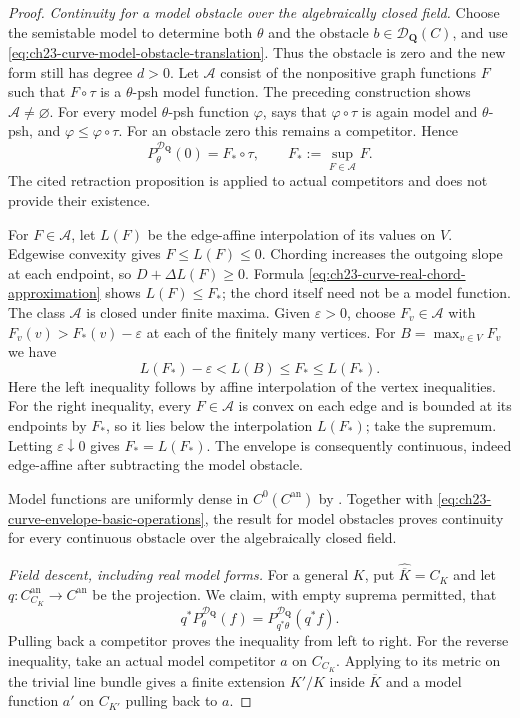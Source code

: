 \begin{proof}
\emph{Continuity for a model obstacle over the algebraically closed field.}
Choose the semistable model to determine both $\theta$ and the obstacle
$b\in\mathcal D_{\mathbf Q}(C)$, and use
\eqref{eq:ch23-curve-model-obstacle-translation}.  Thus the obstacle is zero
and the new form still has degree $d>0$.
Let $\mathcal A$ consist of the nonpositive graph functions $F$ such
that $F\circ\tau$ is a $\theta$-psh model function.
The preceding construction shows $\mathcal A\ne\varnothing$.
For every model $\theta$-psh function $\varphi$,
\cite[Proposition~3.8]{GJKM19} says that $\varphi\circ\tau$ is again
model and $\theta$-psh, and $\varphi\leq\varphi\circ\tau$.
For an obstacle zero this remains a competitor.  Hence
\begin{equation}
\label{eq:ch23-curve-skeletal-envelope}
 P^{\mathcal D_{\mathbf Q}}_\theta(0)=F_*\circ\tau,
 \qquad F_*:=\sup_{F\in\mathcal A}F.
\end{equation}
The cited retraction proposition is applied to actual competitors and
does not provide their existence.

For $F\in\mathcal A$, let $L(F)$ be the edge-affine interpolation of
its values on $V$.  Edgewise convexity gives $F\leq L(F)\leq0$.
Chording increases the outgoing slope at each endpoint, so
$D+\Delta L(F)\geq0$.  Formula
\eqref{eq:ch23-curve-real-chord-approximation} shows $L(F)\leq F_*$;
the chord itself need not be a model function.
The class $\mathcal A$ is closed under finite maxima.  Given
$\varepsilon>0$, choose $F_v\in\mathcal A$ with
$F_v(v)>F_*(v)-\varepsilon$ at each of the finitely many vertices.
For $B=\max_{v\in V}F_v$ we have
\[
 L(F_*)-\varepsilon<L(B)\leq F_*\leq L(F_*).
\]
Here the left inequality follows by affine interpolation of the vertex
inequalities.  For the right inequality, every $F\in\mathcal A$
is convex on each edge and is bounded at its endpoints by $F_*$, so
it lies below the interpolation $L(F_*)$; take the supremum.
Letting $\varepsilon\downarrow0$ gives $F_*=L(F_*)$.
The envelope is consequently continuous, indeed edge-affine after
subtracting the model obstacle.

Model functions are uniformly dense in $C^0(C^{\mathrm{an}})$ by
\cite[Proposition~2.15]{GM19}.  Together with
\eqref{eq:ch23-curve-envelope-basic-operations}, the result for model
obstacles proves continuity for every continuous obstacle over the
algebraically closed field.

\emph{Field descent, including real model forms.}
For a general $K$, put $\widehat{\overline K}=C_K$ and let
$q:C_{C_K}^{\mathrm{an}}\to C^{\mathrm{an}}$ be the projection.
We claim, with empty suprema permitted, that
\begin{equation}
\label{eq:ch23-curve-completed-algebraic-envelope-base-change}
 q^*P^{\mathcal D_{\mathbf Q}}_\theta(f)
  =P^{\mathcal D_{\mathbf Q}}_{q^*\theta}(q^*f).
\end{equation}
Pulling back a competitor proves the inequality from left to right.
For the reverse inequality, take an actual model competitor $a$ on
$C_{C_K}$.  Applying \cite[Proposition~2.18(b)]{GM19} to its metric on
the trivial line bundle gives a finite extension $K'/K$ inside
$\overline K$ and a model function $a'$ on $C_{K'}$ pulling back to
$a$.


\end{proof}
